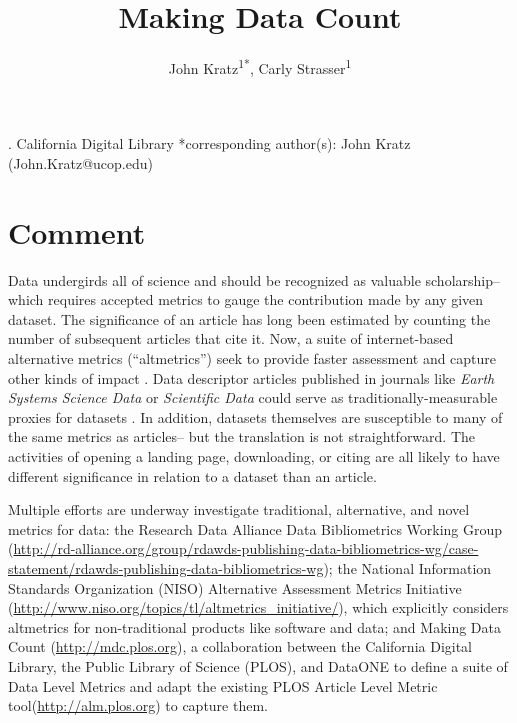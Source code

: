 \documentclass[english]{article}
\begin{document}
\title{Making Data Count}


\author{John Kratz\textsuperscript{1{*}}, Carly Strasser\textsuperscript{1}}

. California Digital Library 
{*}corresponding author(s): John Kratz (John.Kratz@ucop.edu)


\section*{Comment}


Data undergirds all of science and should be recognized as valuable scholarship-- which requires accepted metrics to gauge the contribution made by any given dataset.
The significance of an article has long been estimated by counting the number of subsequent articles that cite it. 
Now, a suite of internet-based alternative metrics (``altmetrics'') seek to provide faster assessment and capture other kinds of impact \cite{priem_altmetrics_2012}.
Data descriptor articles published in journals like \textit{Earth Systems Science Data} or \textit{Scientific Data} could serve as traditionally-measurable proxies for datasets \cite{pfeiffenberger_earth_2011, editors_more_2014}.
In addition, datasets themselves are susceptible to many of the same metrics as articles-- but the translation is not straightforward.
The activities of opening a landing page, downloading, or citing are all likely to have different significance in relation to a dataset than an article.

Multiple efforts are underway investigate traditional, alternative, and novel metrics for data: the Research Data Alliance Data Bibliometrics Working Group (\url{http://rd-alliance.org/group/rdawds-publishing-data-bibliometrics-wg/case-statement/rdawds-publishing-data-bibliometrics-wg}{}); the National Information Standards Organization (NISO) Alternative Assessment Metrics Initiative (\url{http://www.niso.org/topics/tl/altmetrics_initiative/}), which explicitly considers altmetrics for non-traditional products like software and data; and Making Data Count (\url{http://mdc.plos.org}), a collaboration between the California Digital Library, the Public Library of Science (PLOS), and DataONE to define a suite of Data Level Metrics  and adapt the existing PLOS Article Level Metric tool(\url{http://alm.plos.org}) to capture them.
\end{document}
